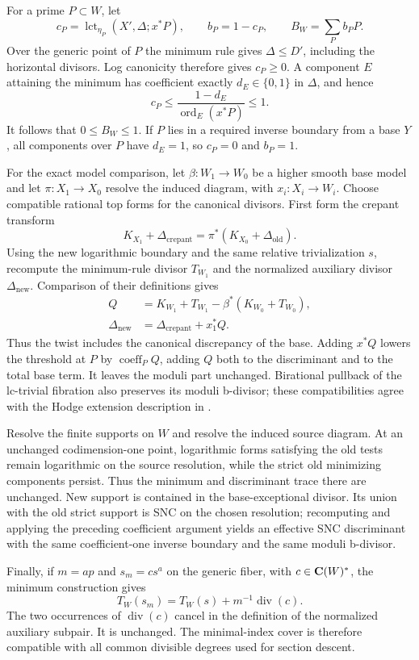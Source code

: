 For a prime $P\subset W$, let
\[
 c_P=\operatorname{lct}_{\eta_P}(X',\Delta;x^*P),
 \qquad b_P=1-c_P,
 \qquad B_W=\sum_Pb_PP.
\]
Over the generic point of $P$ the minimum rule gives
$\Delta\le D'$, including the horizontal divisors. Log canonicity
therefore gives $c_P\ge0$. A component $E$ attaining the minimum
has coefficient exactly $d_E\in\{0,1\}$ in $\Delta$, and hence
\[
 c_P\le\frac{1-d_E}{\operatorname{ord}_E(x^*P)}\le1.
\]
It follows that $0\le B_W\le1$. If $P$ lies in a required inverse
boundary from a base $Y$, all components over $P$ have $d_E=1$,
so $c_P=0$ and $b_P=1$.

For the exact model comparison, let $\beta:W_1\to W_0$ be a
higher smooth base model and let $\pi:X_1\to X_0$ resolve the
induced diagram, with $x_i:X_i\to W_i$. Choose compatible
rational top forms for the canonical divisors. First form the
crepant transform
\[
 K_{X_1}+\Delta_{\mathrm{crepant}}
    =\pi^*(K_{X_0}+\Delta_{\mathrm{old}}).
\]
Using the new logarithmic boundary and the same relative
trivialization $s$, recompute the minimum-rule divisor $T_{W_1}$
and the normalized auxiliary divisor $\Delta_{\mathrm{new}}$.
Comparison of their definitions gives
\begin{equation}\label{p1logcbfalt:model-twist}
 \begin{split}
 Q&=K_{W_1}+T_{W_1}-\beta^*(K_{W_0}+T_{W_0}),\\
 \Delta_{\mathrm{new}}
   &=\Delta_{\mathrm{crepant}}+x_1^*Q.
 \end{split}
\end{equation}
Thus the twist includes the canonical discrepancy of the base.
Adding $x^*Q$ lowers the threshold at $P$ by
$\operatorname{coeff}_P Q$, adding $Q$ both to the discriminant
and to the total base term. It leaves the moduli part unchanged.
Birational pullback of the lc-trivial fibration also preserves its
moduli b-divisor; these compatibilities agree with the Hodge
extension description in \cite[Remarks~6.22 and~6.25]{BFMT}.

Resolve the finite supports on $W$ and resolve the induced source
diagram. At an unchanged codimension-one point, logarithmic forms
satisfying the old tests remain logarithmic on the source
resolution, while the strict old minimizing components persist.
Thus the minimum and discriminant trace there are unchanged.
New support is contained in the base-exceptional divisor. Its union
with the old strict support is SNC on the chosen resolution;
recomputing and applying the preceding coefficient argument yields
an effective SNC discriminant with the same coefficient-one inverse
boundary and the same moduli b-divisor.

Finally, if $m=ap$ and $s_m=c s^a$ on the generic fiber, with
$c\in\mathbf C(W)^*$, the minimum construction gives
\[
 T_W(s_m)=T_W(s)+m^{-1}\operatorname{div}(c).
\]
The two occurrences of $\operatorname{div}(c)$ cancel in the
definition of the normalized auxiliary subpair. It is unchanged.
The minimal-index cover is therefore compatible with all common
divisible degrees used for section descent.
